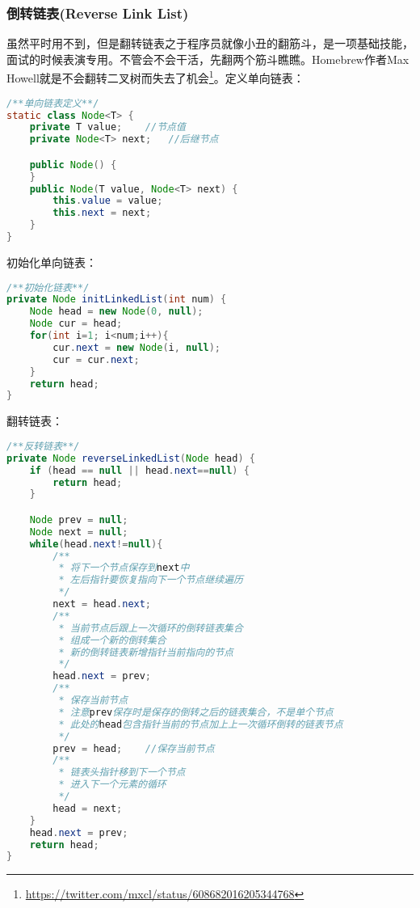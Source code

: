 \documentclass[../../../interview-questions.tex]{subfiles}
\begin{document}
\subsubsection{倒转链表(Reverse Link List)}


虽然平时用不到，但是翻转链表之于程序员就像小丑的翻筋斗，是一项基础技能，面试的时候表演专用。不管会不会干活，先翻两个筋斗瞧瞧。Homebrew作者Max Howell就是不会翻转二叉树而失去了机会\footnote{\url{https://twitter.com/mxcl/status/608682016205344768}}。定义单向链表：


\begin{lstlisting}[language=Java]
/**单向链表定义**/
static class Node<T> {
    private T value;    //节点值
    private Node<T> next;   //后继节点

    public Node() {
    }
    public Node(T value, Node<T> next) {
        this.value = value;
        this.next = next;
    }
}
\end{lstlisting}

初始化单向链表：

\begin{lstlisting}[language=Java]
/**初始化链表**/
private Node initLinkedList(int num) {
    Node head = new Node(0, null);
    Node cur = head;
    for(int i=1; i<num;i++){
        cur.next = new Node(i, null);
        cur = cur.next;
    }
    return head;
}
\end{lstlisting}

翻转链表：

\begin{lstlisting}[language=Java]
/**反转链表**/
private Node reverseLinkedList(Node head) {
    if (head == null || head.next==null) {
        return head;
    }

    Node prev = null;
    Node next = null;
    while(head.next!=null){
        /**
         * 将下一个节点保存到next中
         * 左后指针要恢复指向下一个节点继续遍历
         */
        next = head.next;
        /**
         * 当前节点后跟上一次循环的倒转链表集合
         * 组成一个新的倒转集合
         * 新的倒转链表新增指针当前指向的节点
         */
        head.next = prev;
        /**
         * 保存当前节点
         * 注意prev保存时是保存的倒转之后的链表集合，不是单个节点
         * 此处的head包含指针当前的节点加上上一次循环倒转的链表节点
         */
        prev = head;    //保存当前节点
        /**
         * 链表头指针移到下一个节点
         * 进入下一个元素的循环
         */
        head = next;
    }
    head.next = prev;
    return head;
}
\end{lstlisting}
\end{document}
